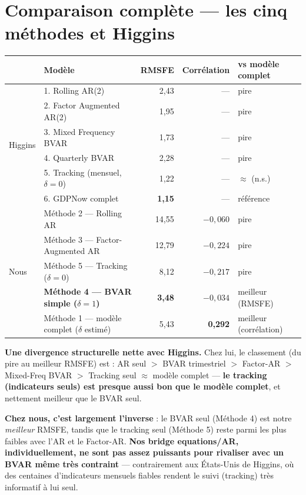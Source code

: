 \documentclass[11pt,a4paper]{article}
\begin{document}
\section{Comparaison complète --- les cinq méthodes et Higgins}

\begin{center}
\small
\begin{tabular}{llrrl}
\toprule
& \textbf{Modèle} & \textbf{RMSFE} & \textbf{Corrélation} & \textbf{vs modèle complet} \\
\midrule
\multirow{6}{*}{Higgins}
& 1. Rolling AR(2) & 2,43 & --- & pire \\
& 2. Factor Augmented AR(2) & 1,95 & --- & pire \\
& 3. Mixed Frequency BVAR & 1,73 & --- & pire \\
& 4. Quarterly BVAR & 2,28 & --- & pire \\
& 5. Tracking (mensuel, $\delta=0$) & 1,22 & --- & $\approx$ (n.s.) \\
& 6. GDPNow complet & \textbf{1,15} & --- & référence \\
\midrule
\multirow{5}{*}{Nous}
& Méthode 2 --- Rolling AR & 14,55 & $-0{,}060$ & pire \\
& Méthode 3 --- Factor-Augmented AR & 12,79 & $-0{,}224$ & pire \\
& Méthode 5 --- Tracking ($\delta=0$) & 8,12 & $-0{,}217$ & pire \\
& \textbf{Méthode 4 --- BVAR simple ($\delta=1$)} & \textbf{3,48} & $-0{,}034$ & meilleur (RMSFE) \\
& Méthode 1 --- modèle complet ($\delta$ estimé) & 5,43 & \textbf{0,292} & meilleur (corrélation) \\
\bottomrule
\end{tabular}
\end{center}

\begin{alertebox}
\textbf{Une divergence structurelle nette avec Higgins.} Chez lui, le classement (du pire au meilleur RMSFE) est : AR seul $>$ BVAR trimestriel $>$ Factor-AR $>$ Mixed-Freq BVAR $>$ Tracking seul $\approx$ modèle complet --- \textbf{le tracking (indicateurs seuls) est presque aussi bon que le modèle complet}, et nettement meilleur que le BVAR seul.

\textbf{Chez nous, c'est largement l'inverse} : le BVAR seul (Méthode 4) est notre \emph{meilleur} RMSFE, tandis que le tracking seul (Méthode 5) reste parmi les plus faibles avec l'AR et le Factor-AR. \textbf{Nos bridge equations/AR, individuellement, ne sont pas assez puissants pour rivaliser avec un BVAR même très contraint} --- contrairement aux États-Unis de Higgins, où des centaines d'indicateurs mensuels fiables rendent le suivi (tracking) très informatif à lui seul.
\end{alertebox}
\end{document}
